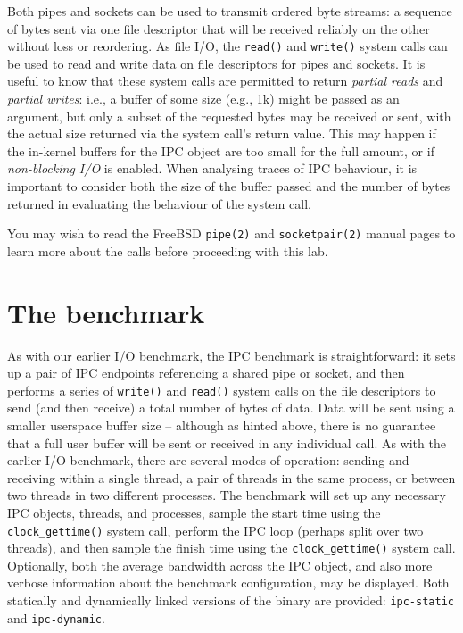 \documentclass[a4paper,10pt]{article}
\begin{document}
Both pipes and sockets can be used to transmit ordered byte streams: a
sequence of bytes sent via one file descriptor that will be received reliably
on the other without loss or reordering.
As file I/O, the \texttt{read()} and \texttt{write()} system calls can be used
to read and write data on file descriptors for pipes and sockets.
It is useful to know that these system calls are permitted to return
\textit{partial reads} and \textit{partial writes}: i.e., a buffer of some
size (e.g., 1k) might be passed as an argument, but only a subset of the
requested bytes may be received or sent, with the actual size returned via the
system call's return value.
This may happen if the in-kernel buffers for the IPC object are too small for
the full amount, or if \textit{non-blocking I/O} is enabled.
When analysing traces of IPC behaviour, it is important to consider both the
size of the buffer passed and the number of bytes returned in evaluating the
behaviour of the system call.

You may wish to read the FreeBSD \texttt{pipe(2)} and \texttt{socketpair(2)}
manual pages to learn more about the calls before proceeding with this lab.

\section*{The benchmark}

As with our earlier I/O benchmark, the IPC benchmark is straightforward: it
sets up a pair of IPC endpoints referencing a shared pipe or socket, and then
performs a series of \texttt{write()} and \texttt{read()} system calls on the
file descriptors to send (and then receive) a total number of bytes of data.
Data will be sent using a smaller userspace buffer size -- although as hinted
above, there is no guarantee that a full user buffer will be sent or received
in any individual call.
As with the earlier I/O benchmark, there are several modes of operation:
sending and receiving within a single thread, a pair of threads in the same
process, or between two threads in two different processes.
The benchmark will set up any necessary IPC objects, threads, and processes,
sample the start time using the \texttt{clock\_gettime()} system call, perform
the IPC loop (perhaps split over two threads), and then sample the finish time
using the \texttt{clock\_gettime()} system call.
Optionally, both the average bandwidth across the IPC object, and also more
verbose information about the benchmark configuration, may be displayed.
Both statically and dynamically linked versions of the binary are provided:
\texttt{ipc-static} and \texttt{ipc-dynamic}.
\end{document}

